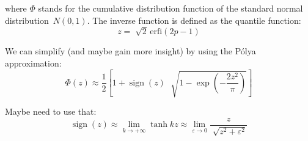 \documentclass{article}
\DeclareMathOperator{\sign}{sign}
\begin{document}
\noindent where $\Phi$ stands for the cumulative distribution function of the standard normal distribution~$N(0, 1)$.  The inverse function is defined as the quantile function:
\begin{equation}
z = \sqrt[]{2} \, \mbox{erfi}(2 p - 1)
\end{equation}

\noindent We can simplify (and maybe gain more insight) by using the P\'{o}lya approximation:
\begin{equation}
\Phi(z) \approx \frac{1}{2} \left[ 1 + \sign(z) \, \, \sqrt[]{1 - \exp \left( - \frac{2 z^2}{\pi} \right)} \right]
\end{equation}

\noindent Maybe need to use that:
\begin{equation}
\sign(z) \approx \lim_{k \rightarrow + \infty} \tanh k z \approx \lim_{\varepsilon \rightarrow 0} \frac{z}{\sqrt[]{z^2 + \varepsilon^2}}
\end{equation}
\end{document}
